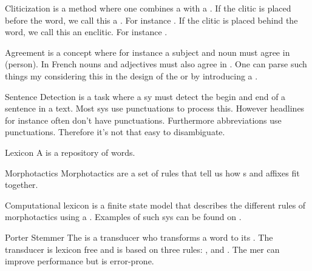 \begin{df}{Cliticization}
\sb{} is a method where one combines a  with a . If the clitic is placed before the word, we call this a . For instance . If the clitic is placed behind the word, we call this an enclitic. For instance .
\end{df}
\begin{df}{Agreement}
\sb{} is a concept where for instance a subject and noun must agree in  (person). In French nouns and adjectives must also agree in . One can parse such things my considering this in the design of the  or by introducing a .
\end{df}
\begin{df}{Sentence Detection}
\sb{} is a task where a sy must detect the begin and end of a sentence in a text. Most sys use punctuations to process this. However headlines for instance often don't have punctuations. Furthermore abbreviations use punctuations. Therefore it's not that easy to disambiguate.
\end{df}
\begin{df}{Lexicon}
A \sb{} is a repository of words.
\end{df}
\begin{df}{Morphotactics}
Morphotactics are a set of rules that tell us how s and affixes fit together.
\end{df}
\begin{df}{Computational lexicon}
\sb{} is a finite state model that describes the different rules of morphotactics using a . Examples of such sys can be found on .
\end{df}
\begin{df}{Porter Stemmer}
The \sb{} is a transducer who transforms a word to its . The transducer is lexicon free and is based on three rules: ,  and . The mer can improve performance but is error-prone.
\end{df}
